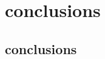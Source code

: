 \documentclass[doctor,openright]{tongjithesis}
\begin{document}
\graphicspath{{figures/}}


\frontmatter

\makecover



\tableofcontents






\mainmatter


\chapter{conclusions}
\section{conclusions}
\backmatter

\makeatother

%

%




\begin{appendix}

\end{appendix}


\end{document}

